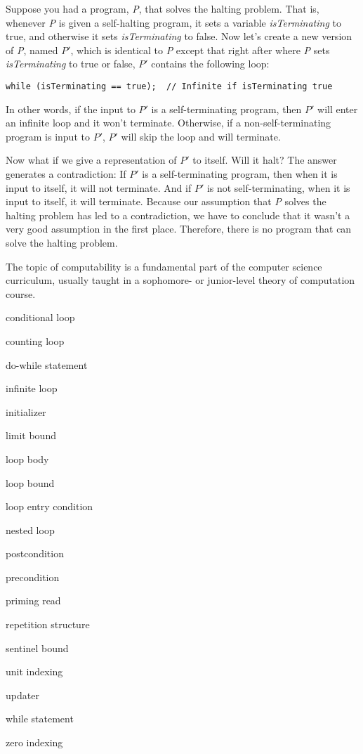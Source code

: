 Suppose you had a program, {\it P}, that solves the halting problem.
That is, whenever {\it P} is given a self-halting program, it
sets a variable {\it isTerminating} to true, and otherwise it
sets {\it isTerminating} to false. Now let's create a new version of
{\it P}, named $P\prime$, which is identical to {\it P} except that
right after where {\it P} sets {\it isTerminating} to true or false,
$P\prime$ contains the following loop:

\begin{jjjlisting}[29pc]
\begin{lstlisting}
while (isTerminating == true);  // Infinite if isTerminating true
\end{lstlisting}
\end{jjjlisting}

\noindent In other words, if the input to $P\prime$  is a self-terminating
program, then $P\prime$ will enter an infinite loop and it won't
terminate.  Otherwise, if a non-self-terminating program is input to
$P\prime$, $P\prime$ will skip the loop and will terminate.

Now what if we give a representation of $P\prime$ to itself. Will it halt?
The answer generates a contradiction: If $P\prime$  is a self-terminating
program, then when it is input to itself, it will not terminate.  And
if $P\prime$ is not self-terminating, when it is input to itself, it will
terminate. Because our assumption that {\it P} solves the halting problem
has led to a contradiction, we have to conclude that it wasn't a very
good assumption in the first place. Therefore, there is no program
that can solve the halting problem.

The topic of computability is a fundamental part of the computer
science curriculum, usually taught in a sophomore- or junior-level
theory of computation course.

\label{chapter-summary}
\label{technical-terms}

\begin{KT}
conditional loop

counting loop

do-while statement

infinite loop

initializer

limit bound

loop body

loop bound

loop entry condition

nested loop

postcondition

precondition 

priming read

repetition structure

sentinel bound

unit indexing

updater

while statement

zero indexing

\end{KT}


